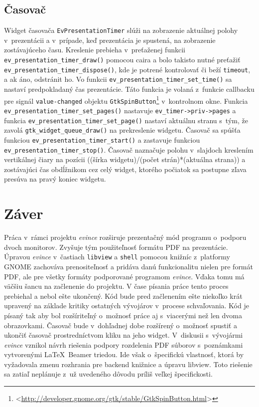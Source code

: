 \documentclass[12pt,oneside,final]{fithesis2}
\begin{document}
\section{Časovač}
Widget časovača \texttt{EvPresentationTimer} slúži na zobrazenie aktuálnej polohy v~prezentácii a v~prípade, keď prezentácia je spustená, na zobrazenie zostávajúceho času. Kreslenie prebieha v~preťaženej funkcii \texttt{ev\_\-presentation\_\-timer\_\-draw()} pomocou caira a bolo takisto nutné preťažiť \texttt{ev\_\-presentation\_\-timer\_\-dispose()}, kde je potrené kontrolovať či beží \texttt{timeout}, a ak áno, odstránit ho. Vo funkcii \texttt{ev\_\-presentation\_\-timer\_\-set\_\-time()} sa nastaví predpokladaný čas prezentácie. Táto funkcia je volaná z~funkcie callbacku pre signál \texttt{value-changed} objektu \texttt{GtkSpinButton}\footnote{<\url{http://developer.gnome.org/gtk/stable/GtkSpinButton.html}>} v~kontrolnom okne. Funkcia \texttt{ev\_\-presentation\_\-timer\_\-set\_\-pages()} nastavuje \texttt{ev\_\-timer->priv->pages} a funkcia \texttt{ev\_\-presentation\_\-timer\_\-set\_\-page()} nastaví aktuálnu stranu s~tým, že zavolá \texttt{gtk\_\-widget\_\-queue\_\-draw()} na prekreslenie widgetu. Časovač sa spúšťa funkciou \texttt{ev\_\-presentation\_\-timer\_\-start()} a zastavuje funkciou \texttt{ev\_\-presentation\_\-timer\_\-stop()}. Časovač naznačuje polohu v~slajdoch kreslením vertikálnej čiary na pozícii ((šírka widgetu)/(počet strán)*(aktuálna strana)) a zostávajúci čas obdĺžnikom cez celý widget, ktorého počiatok sa postupne zľava presúva na pravý koniec widgetu.

\chapter{Záver}
Práca v~rámci projektu \emph{evince} rozširuje prezentačný mód programu o~podporu dvoch monitorov. Zvyšuje tým použiteľnosť formátu PDF na prezentácie. Úpravou \emph{evince} v~častiach \texttt{libview} a \texttt{shell} pomocou knižníc z~platformy GNOME zachováva prenositeľnosť a pridáva danú funkcionalitu nielen pre formát PDF, ale pre všetky formáty podporované programom \emph{evince}. Vďaka tomu má väčšiu šancu na začlenenie do projektu. V čase písania práce tento proces prebiehal a nebol ešte ukončený. Kód bude pred začlenením ešte niekoľko krát upravený na základe kritiky ostatných vývojárov v~procese schvaľovania. Kód je písaný tak aby bol rozšíriteľný o~možnosť práce aj s~viacerými než len dvoma obrazovkami. Časovač bude v~dohľadnej dobe rozšírený o~možnosť spustiť a ukončiť časovač prostredníctvom kliku na jeho widget. V~diskusii s~vývojármi \emph{evince} vznikol návrh riešenia podpory rozdelenia PDF súborov s~poznámkami vytvorenými \LaTeX~Beamer triedou. Ide však o~špecifickú vlastnosť, ktorá by vyžadovala zmenu rozhrania pre backend knižnice a úpravu libview. Toto riešenie sa zatiaľ neplánuje z~už uvedeného dôvodu príliš veľkej špecifickosti.
\end{document}
